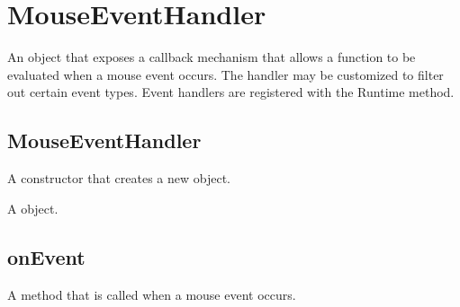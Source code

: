 \documentclass[letterpaper,12pt,english,openany,oneside]{sphinxmanual}
\begin{document}
\label{\detokenize{JS_3D_API:properties-18}}


\section{MouseEventHandler}
\label{\detokenize{JS_3D_API:mouseeventhandler}}
An object that exposes a callback mechanism that allows a function to be evaluated when a mouse event occurs. The handler may be customized to filter out certain event types. Event handlers are registered with the Runtime  method.

\label{\detokenize{JS_3D_API:properties-19}}


\subsection{MouseEventHandler}
\label{\detokenize{JS_3D_API:mouseeventhandler-1}}\label{\detokenize{JS_3D_API:id19}}
A constructor that creates a new  object.

\label{\detokenize{JS_3D_API:syntax-69}}

\begin{sphinxVerbatim}[commandchars=\\\{\}]
 
\end{sphinxVerbatim}
\label{\detokenize{JS_3D_API:returns-70}}

A  object.


\subsection{onEvent}
\label{\detokenize{JS_3D_API:onevent-4}}\label{\detokenize{JS_3D_API:id20}}
A method that is called when a mouse event occurs.

\label{\detokenize{JS_3D_API:syntax-70}}

\begin{sphinxVerbatim}[commandchars=\\\{\}]
\end{sphinxVerbatim}
\label{\detokenize{JS_3D_API:parameters-52}}
\end{document}
